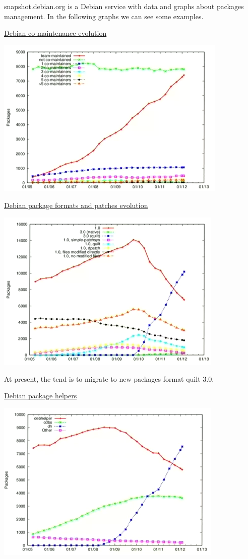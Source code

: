 \documentclass[11pt]{article}
\begin{document}
snapshot.debian.org is a Debian service with data and graphs about packages management. In the following graphs we can see some examples. 

\underline{Debian co-maintenance evolution}

\includegraphics[scale=0.7]{img/comaintenance}

\underline{Debian package formats and patches evolution }

\includegraphics[scale=0.7]{img/package-formats-patches}

At present, the tend is to migrate to new packages format quilt 3.0.

\underline{Debian package helpers}

\includegraphics[scale=0.7]{img/packagesHelpers}
\end{document}
